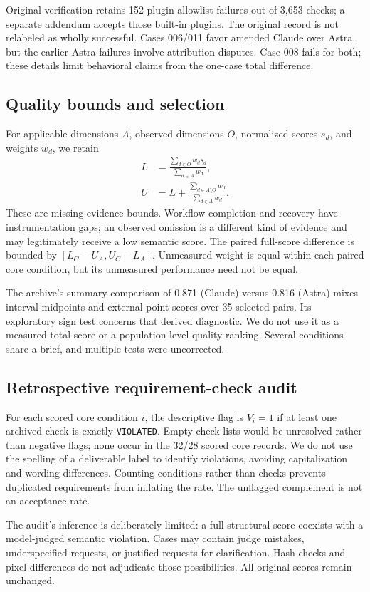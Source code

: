 Original verification retains 152 plugin-allowlist failures out of 3,653 checks; a separate addendum accepts those built-in plugins. The original record is not relabeled as wholly successful. Cases 006/011 favor amended Claude over Astra, but the earlier Astra failures involve attribution disputes. Case 008 fails for both; these details limit behavioral claims from the one-case total difference.

\subsection{Quality bounds and selection}
For applicable dimensions $A$, observed dimensions $O$, normalized scores $s_d$, and weights $w_d$, we retain
\begin{align}
 L &= \frac{\sum_{d\in O}w_ds_d}{\sum_{d\in A}w_d},\\
 U &= L+\frac{\sum_{d\in A\setminus O}w_d}{\sum_{d\in A}w_d}.
\end{align}
These are missing-evidence bounds. Workflow completion and recovery have instrumentation gaps; an observed omission is a different kind of evidence and may legitimately receive a low semantic score. The paired full-score difference is bounded by $[L_C-U_A,U_C-L_A]$. Unmeasured weight is equal within each paired core condition, but its unmeasured performance need not be equal.

The archive's summary comparison of 0.871 (Claude) versus 0.816 (Astra) mixes interval midpoints and external point scores over 35 selected pairs. Its exploratory sign test concerns that derived diagnostic. We do not use it as a measured total score or a population-level quality ranking. Several conditions share a brief, and multiple tests were uncorrected.

\subsection{Retrospective requirement-check audit}
For each scored core condition $i$, the descriptive flag is $V_i=1$ if at least one archived check is exactly \texttt{VIOLATED}. Empty check lists would be unresolved rather than negative flags; none occur in the 32/28 scored core records. We do not use the spelling of a deliverable label to identify violations, avoiding capitalization and wording differences. Counting conditions rather than checks prevents duplicated requirements from inflating the rate. The unflagged complement is not an acceptance rate.

The audit's inference is deliberately limited: a full structural score coexists with a model-judged semantic violation. Cases may contain judge mistakes, underspecified requests, or justified requests for clarification. Hash checks and pixel differences do not adjudicate those possibilities. All original scores remain unchanged.
